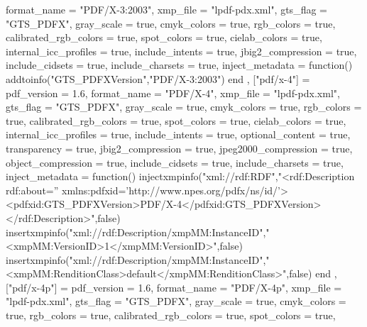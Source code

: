 {{            format_name             = "PDF/X-3:2003",
            xmp_file                = "lpdf-pdx.xml",
            gts_flag                = "GTS_PDFX",
            gray_scale              = true,
            cmyk_colors             = true,
            rgb_colors              = true,
            calibrated_rgb_colors   = true,
            spot_colors             = true,
            cielab_colors           = true,
            internal_icc_profiles   = true,
            include_intents         = true,
            jbig2_compression       = true,
            include_cidsets         = true,
            include_charsets        = true,
            inject_metadata         = function()
                addtoinfo("GTS_PDFXVersion","PDF/X-3:2003")
            end
        },
        ["pdf/x-4"] =
        {
            pdf_version             = 1.6,
            format_name             = "PDF/X-4",
            xmp_file                = "lpdf-pdx.xml",
            gts_flag                = "GTS_PDFX",
            gray_scale              = true,
            cmyk_colors             = true,
            rgb_colors              = true,
            calibrated_rgb_colors   = true,
            spot_colors             = true,
            cielab_colors           = true,
            internal_icc_profiles   = true,
            include_intents         = true,
            optional_content        = true,
            transparency            = true,
            jbig2_compression       = true,
            jpeg2000_compression    = true,
            object_compression      = true,
            include_cidsets         = true,
            include_charsets        = true,
            inject_metadata         = function()
                injectxmpinfo("xml://rdf:RDF","<rdf:Description rdf:about='' xmlns:pdfxid='http://www.npes.org/pdfx/ns/id/'><pdfxid:GTS_PDFXVersion>PDF/X-4</pdfxid:GTS_PDFXVersion></rdf:Description>",false)
                insertxmpinfo("xml://rdf:Description/xmpMM:InstanceID","<xmpMM:VersionID>1</xmpMM:VersionID>",false)
                insertxmpinfo("xml://rdf:Description/xmpMM:InstanceID","<xmpMM:RenditionClass>default</xmpMM:RenditionClass>",false)
            end
        },
        ["pdf/x-4p"] = {
            pdf_version             = 1.6,
            format_name             = "PDF/X-4p",
            xmp_file                = "lpdf-pdx.xml",
            gts_flag                = "GTS_PDFX",
            gray_scale              = true,
            cmyk_colors             = true,
            rgb_colors              = true,
            calibrated_rgb_colors   = true,
            spot_colors             = true,
}}
